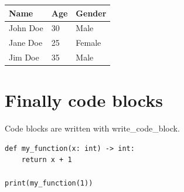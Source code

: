 \documentclass[a4paper]{report}
\begin{document}
\noindent
\begin{tabular}{lll}
\toprule
\textbf{Name} & \textbf{Age} & \textbf{Gender} \\
\midrule
John Doe & 30 & Male \\
Jane Doe & 25 & Female \\
Jim Doe & 35 & Male \\
\bottomrule
\end{tabular}
\par\medskip

\section{Finally code blocks}

Code blocks are written with write\_code\_block.

\begin{verbatim}
def my_function(x: int) -> int:
    return x + 1

print(my_function(1))
\end{verbatim}
\end{document}
